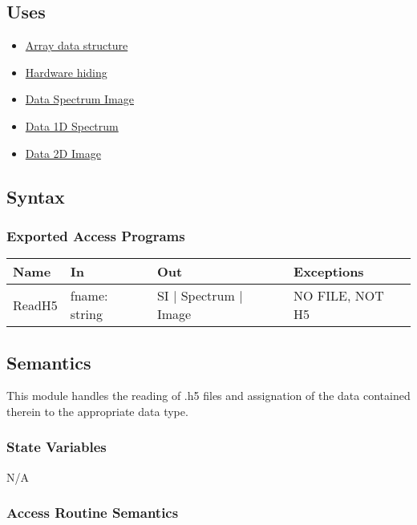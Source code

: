 \documentclass[12pt, titlepage]{article}
\begin{document}
\subsection{Uses}
\begin{itemize}
    \item \hyperref[Mod:Array]{Array data structure}
    \item \hyperref[Mod:HH]{Hardware hiding}
    \item \hyperref[Mod:SI]{Data Spectrum Image}
    \item \hyperref[Mod:Spectrum]{Data 1D Spectrum}
    \item \hyperref[Mod:Image]{Data 2D Image}
\end{itemize}

\subsection{Syntax}

\subsubsection{Exported Access Programs}

\begin{center}
    \begin{tabular}{p{2cm} p{4cm} p{4cm} p{2cm}}
        \hline
        \textbf{Name} & \textbf{In} & \textbf{Out} & \textbf{Exceptions} \\
        \hline
        ReadH5 & fname: string & SI $|$ Spectrum $|$ Image & NO FILE, NOT H5 \\
        \hline
    \end{tabular}
\end{center}

\subsection{Semantics}
This module handles the reading of .h5 files and assignation of the data
contained therein to the appropriate data type.

\subsubsection{State Variables}
N/A

\subsubsection{Access Routine Semantics}
\end{document}
